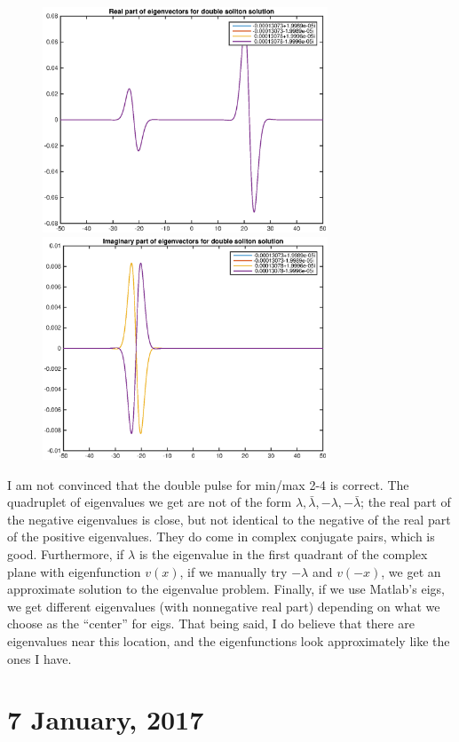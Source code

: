 \documentclass[12pt]{article}
\begin{document}
\begin{enumerate}
\begin{figure}[H]
\includegraphics[width=8.5cm]{double4vecreal.eps}
\includegraphics[width=8.5cm]{double4vecimag.eps}
\end{figure}

\end{enumerate}

I am not convinced that the double pulse for min/max 2-4 is correct. The quadruplet of eigenvalues we get are not of the form $\lambda, 
\bar{\lambda}, -\lambda, -\bar{\lambda}$; the real part of the negative eigenvalues is close, but not identical to the negative of the real part of the positive eigenvalues. They do come in complex conjugate pairs, which is good. Furthermore, if $\lambda$ is the eigenvalue in the first quadrant of the complex plane with eigenfunction $v(x)$, if we manually try $-\lambda$ and $v(-x)$, we get an approximate solution to the eigenvalue problem. Finally, if we use Matlab's \textrm{eigs}, we get different eigenvalues (with nonnegative real part) depending on what we choose as the ``center'' for \textrm{eigs}. That being said, I do believe that there are eigenvalues near this location, and the eigenfunctions look approximately like the ones I have.

\section*{7 January, 2017}
\end{document}
